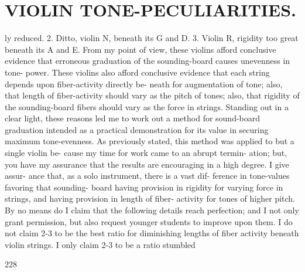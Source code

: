 \documentclass{article}
\begin{document}
\section*{VIOLIN TONE-PECULIARITIES.}
ly reduced. 2. Ditto, violin N, beneath its G and D. 3. Violin R, rigidity too great beneath its A and E. From my point of view, these violins afford conclusive evidence that erroneous graduation of the sounding-board causes unevenness in tone- power. These violins also afford conclusive evidence that each string depends upon fiber-activity directly be- neath for augmentation of tone; also, that length of fiber-activity should vary as the pitch of tones; also, that rigidity of the sounding-board fibers should vary as the force in strings. Standing out in a clear light, these reasons led me to work out a method for sound-board graduation intended as a practical demonstration for its value in securing maximum tone-evenness. As previously stated, this method was applied to but a single violin be- cause my time for work came to an abrupt termin- ation; but, you have my assurance that the results are encouraging in a high degree. I give assur- ance that, as a solo instrument, there is a vast dif- ference in tone-values favoring that sounding- board having provision in rigidity for varying force in strings, and having provision in length of fiber- activity for tones of higher pitch. By no means do I claim that the following details reach perfection; and I not only grant permission, but also request younger students to improve upon them. I do not claim 2-3 to be the best ratio for diminishing lengths of fiber activity beneath violin strings. I only claim 2-3 to be a ratio stumbled

228
\end{document}
